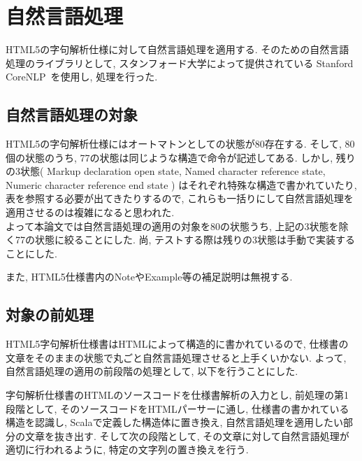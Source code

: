\documentclass[uplatex,a4j]{jsreport}
\begin{document}
\chapter{自然言語処理}
HTML5の字句解析仕様に対して自然言語処理を適用する. 
そのための自然言語処理のライブラリとして, スタンフォード大学によって提供されている Stanford CoreNLP~\cite{manning-EtAl:2014:P14-5}を使用し, 処理を行った.

\label{自然言語処理}
\section{自然言語処理の対象}
HTML5の字句解析仕様にはオートマトンとしての状態が80存在する. 
そして, 80個の状態のうち, 77の状態は同じような構造で命令が記述してある. 
しかし, 残りの3状態(
Markup declaration open state, 
Named character reference state, 
Numeric character reference end state
)
はそれぞれ特殊な構造で書かれていたり, 表を参照する必要が出てきたりするので, これらも一括りにして自然言語処理を適用させるのは複雑になると思われた. \\
よって本論文では自然言語処理の適用の対象を80の状態うち, 上記の3状態を除く77の状態に絞ることにした.
尚, テストする際は残りの3状態は手動で実装することにした.

また, HTML5仕様書内のNoteやExample等の補足説明は無視する.

\section{対象の前処理}
HTML5字句解析仕様書はHTMLによって構造的に書かれているので, 仕様書の文章をそのままの状態で丸ごと自然言語処理させると上手くいかない.
よって, 自然言語処理の適用の前段階の処理として, 以下を行うことにした.

字句解析仕様書のHTMLのソースコードを仕様書解析の入力とし, 
前処理の第1段階として, そのソースコードをHTMLパーサーに通し, 仕様書の書かれている構造を認識し, Scalaで定義した構造体に置き換え, 自然言語処理を適用したい部分の文章を抜き出す. 
そして次の段階として, その文章に対して自然言語処理が適切に行われるように, 特定の文字列の置き換えを行う. 

\end{document}
